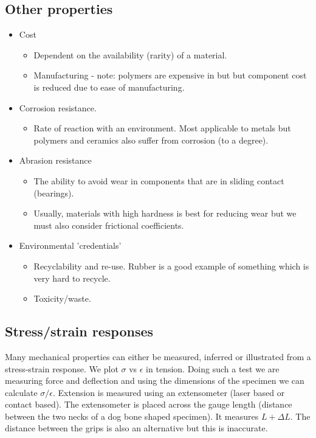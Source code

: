 \documentclass[class=report, crop=false, 12pt,a4paper]{standalone}
\begin{document}
\subsection{Other properties}
\begin{itemize}[noitemsep]
  \item Cost
  \begin{itemize}
    \item Dependent on the availability (rarity) of a material. 
    \item Manufacturing - note: polymers are expensive in but but component cost is reduced due to ease of manufacturing.
  \end{itemize}
  \item Corrosion resistance.
  \begin{itemize}
    \item Rate of reaction with an environment. Most applicable to metals but polymers and ceramics also suffer from corrosion (to a degree).
  \end{itemize}
  \item Abrasion resistance
  \begin{itemize} 
    \item The ability to avoid wear in components that are in sliding contact (bearings). 
    \item Usually, materials with high hardness is best for reducing wear but we must also consider frictional coefficients.
  \end{itemize}
  \item Environmental 'credentials'
  \begin{itemize}
    \item Recyclability and re-use. Rubber is a good example of something which is very hard to recycle.
    \item Toxicity/waste.
  \end{itemize}
\end{itemize}
\subsection{Stress/strain responses}
Many mechanical properties can either be measured, inferred or illustrated from a stress-strain response. We plot \(\sigma\) vs \(\epsilon\) in tension. Doing such a test we are measuring force and deflection and using the dimensions of the specimen we can calculate \(\sigma/\epsilon\). Extension is measured using an extensometer (laser based or contact based). The extensometer is placed across the gauge length (distance between the two necks of a dog bone shaped specimen). It measures \(L + \Delta L\). The distance between the grips is also an alternative but this is inaccurate. 
\end{document}
